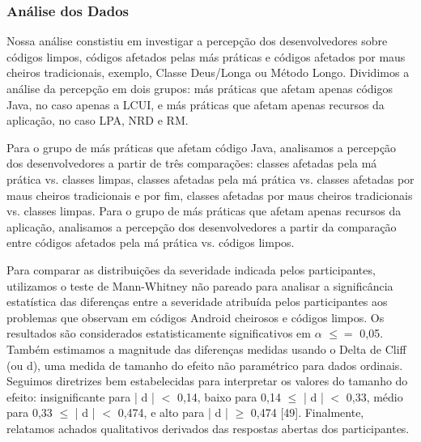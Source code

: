 
\subsubsection{Análise dos Dados}
\label{sub:perception-participants-analysis}

Nossa análise constistiu em investigar a percepção dos desenvolvedores sobre códigos limpos, códigos afetados pelas más práticas e códigos afetados por maus cheiros tradicionais, exemplo, Classe Deus/Longa ou Método Longo. Dividimos a análise da percepção em dois grupos: más práticas que afetam apenas códigos Java, no caso apenas a LCUI, e más práticas que afetam apenas recursos da aplicação, no caso LPA, NRD e RM.

Para o grupo de más práticas que afetam código Java, analisamos a percepção dos desenvolvedores a partir de três comparações: classes afetadas pela má prática vs. classes limpas, classes afetadas pela má prática vs. classes afetadas por maus cheiros tradicionais e por fim, classes afetadas por maus cheiros tradicionais vs. classes limpas. Para o grupo de más práticas que afetam apenas recursos da aplicação, analisamos a percepção dos desenvolvedores a partir da comparação entre códigos afetados pela má prática vs. códigos limpos.

Para comparar as distribuições da severidade indicada pelos participantes, utilizamos o teste de Mann-Whitney não pareado \cite{Conover1999} para analisar a significância estatística das diferenças entre a severidade atribuída pelos participantes aos problemas que observam em códigos Android cheirosos e códigos limpos. Os resultados são considerados estatisticamente significativos em $\alpha$ $\leq{=}$ 0,05. Também estimamos a magnitude das diferenças medidas usando o Delta de Cliff (ou d), uma medida de tamanho do efeito não paramétrico \cite{GrissomKim2005} para dados ordinais. Seguimos diretrizes bem estabelecidas para interpretar os valores do tamanho do efeito: insignificante para | d | $<$ 0,14, baixo para 0,14 $\leq$ | d | $<$ 0,33, médio para 0,33 $\leq$ | d | $<$ 0,474, e alto para | d | $\geq$ 0,474 [49]. Finalmente, relatamos achados qualitativos derivados das respostas abertas dos participantes.


